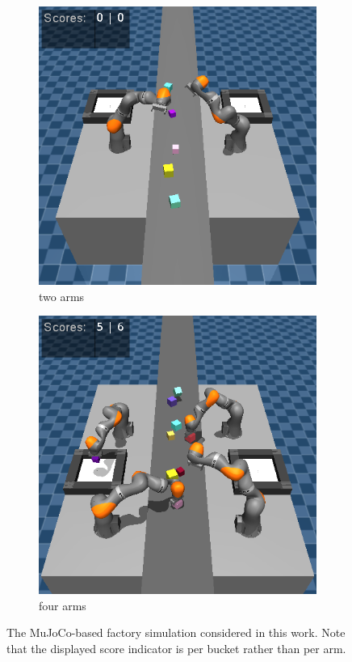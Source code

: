 \documentclass[conference,a4paper]{IEEEtran}
\begin{document}
\begin{figure}[t]
	\centering
	\begin{subfigure}[b]{0.45\linewidth}
		\includegraphics[width=\linewidth]{figures/screenshot_two_arms.png}
		\caption{two arms}
		\label{fig:two-arms}
	\end{subfigure}
	\hfill
	\begin{subfigure}[b]{0.45\linewidth}
		\includegraphics[width=\textwidth]{figures/screenshot_four_arms.png}
		\caption{four arms}
		\label{fig:four-arms}
	\end{subfigure}
    
	\caption{The MuJoCo-based factory simulation considered in this work. Note that the displayed score indicator is per bucket rather than per arm.}
	\label{fig:env}
\end{figure}
\end{document}
